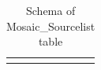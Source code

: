 \documentclass[12pt]{article}
\begin{document}
\begin{table}[thbp]
\begin{center}
{\begin{tabular}{llllll}
\hline\\
\end{tabular}
}
\caption{Schema of Mosaic\_Sourcelist table}
\end{center}
\end{table}
\end{document}
